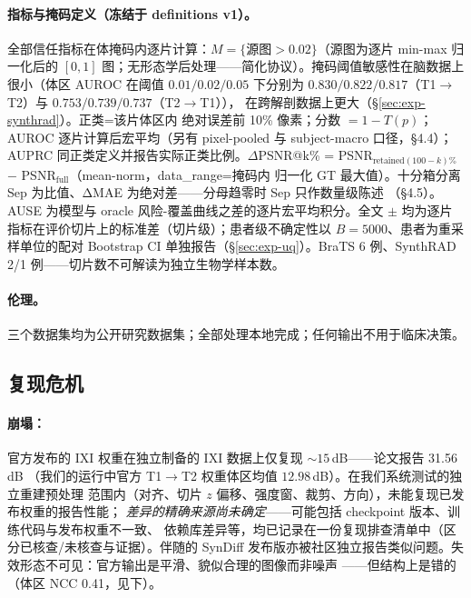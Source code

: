 \documentclass[11pt]{article}
\begin{document}
\paragraph{指标与掩码定义（冻结于 definitions v1）。}
全部信任指标在体掩码内逐片计算：$M=\{\text{源图}>0.02\}$（源图为逐片 min-max 归一化后的
$[0,1]$ 图；无形态学后处理——简化协议）。掩码阈值敏感性在脑数据上很小（体区 AUROC 在阈值
$0.01/0.02/0.05$ 下分别为 $0.830/0.822/0.817$（T1$\to$T2）与 $0.753/0.739/0.737$（T2$\to$T1）），
在跨解剖数据上更大（\S\ref{sec:exp-synthrad}）。正类=该片体区内
绝对误差前 10\% 像素；分数 $=1-T(p)$；AUROC 逐片计算后宏平均（另有 pixel-pooled 与
subject-macro 口径，\S4.4）；AUPRC 同正类定义并报告实际正类比例。$\Delta$PSNR@k\% =
PSNR$_{\text{retained}(100-k)\%}$ $-$ PSNR$_{\text{full}}$（mean-norm，data\_range=掩码内
归一化 GT 最大值）。十分箱分离 Sep 为比值、ΔMAE 为绝对差——分母趋零时 Sep 只作数量级陈述
（\S4.5）。AUSE 为模型与 oracle 风险-覆盖曲线之差的逐片宏平均积分。全文 $\pm$ 均为逐片指标在评价切片上的标准差（切片级）；患者级不确定性以 $B{=}5000$、患者为重采样单位的配对 Bootstrap CI 单独报告（\S\ref{sec:exp-uq}）。BraTS 6 例、SynthRAD 2/1 例——切片数不可解读为独立生物学样本数。
\paragraph{伦理。}
三个数据集均为公开研究数据集；全部处理本地完成；任何输出不用于临床决策。

\subsection{复现危机}
\label{sec:exp-repro}
\paragraph{崩塌：}
官方发布的 IXI 权重在独立制备的 IXI 数据上仅复现 ${\sim}15$\,dB——论文报告 31.56\,dB
（我们的运行中官方 T1$\to$T2 权重体区均值 $12.98$\,dB）。在我们系统测试的独立重建预处理
范围内（对齐、切片 $z$ 偏移、强度窗、裁剪、方向），未能复现已发布权重的报告性能；
\emph{差异的精确来源尚未确定}——可能包括 checkpoint 版本、训练代码与发布权重不一致、
依赖库差异等，均已记录在一份复现排查清单中（区分已核查/未核查与证据）。伴随的 SynDiff
发布版亦被社区独立报告类似问题。失效形态不可见：官方输出是平滑、貌似合理的图像而非噪声
——但结构上是错的（体区 NCC 0.41，见下）。
\end{document}
